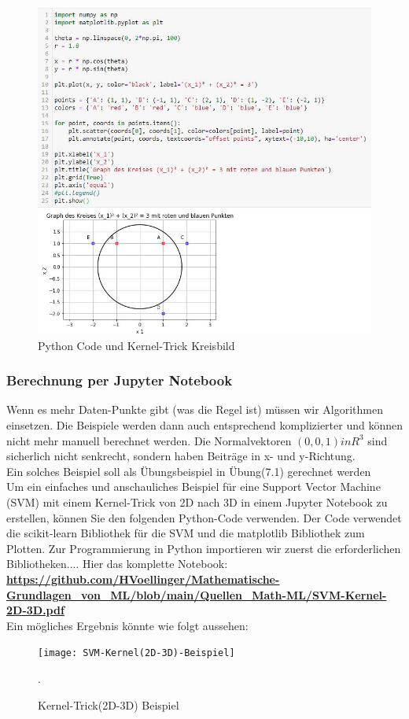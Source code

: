 \documentclass[12pt]{article}
\begin{document}
\begin{figure}[tp]
  \centering
  \hspace*{-0.1cm} 
  \includegraphics[width=1.1\textwidth]{SVM-Kreisbild-Python}
  \caption{Python Code und Kernel-Trick Kreisbild}       
  \label{fig:SVM_Kreis}
\end{figure}
%
\newpage
\subsubsection{Berechnung per Jupyter Notebook}
Wenn es mehr Daten-Punkte gibt (was die Regel ist) müssen wir Algorithmen einsetzen. Die Beispiele werden dann auch entsprechend komplizierter und können nicht mehr manuell berechnet werden. Die Normalvektoren $ (0,0,1)in {R}^3 $ sind sicherlich nicht senkrecht, sondern haben Beiträge in x- und y-Richtung.\\
Ein solches Beispiel soll als Übungsbeispiel in Übung(7.1) gerechnet werden\\[0.3cm]
% 
Um ein einfaches und anschauliches Beispiel für eine Support Vector Machine (SVM) mit einem Kernel-Trick von 2D nach 3D in einem Jupyter Notebook zu erstellen, können Sie den folgenden Python-Code verwenden. Der Code 
verwendet die scikit-learn Bibliothek für die SVM und die matplotlib Bibliothek zum Plotten. Zur Programmierung in Python importieren wir zuerst die erforderlichen Bibliotheken.... Hier das komplette Notebook:\\[0.2cm]
\textbf{\url{https://github.com/HVoellinger/Mathematische-Grundlagen_von_ML/blob/main/Quellen_Math-ML/SVM-Kernel-2D-3D.pdf}}\\
Ein mögliches Ergebnis könnte wie folgt aussehen: \\
\begin{figure}[tp]
  \centering
  \hspace*{-0.1cm} 
  \texttt{[image: SVM-Kernel(2D-3D)-Beispiel]}
  \caption{Kernel-Trick(2D-3D) Beispiel} .\\[10.2cm]      
  \label{fig:SVM_2D-3D}
\end{figure}
%
\newpage
\end{document}
